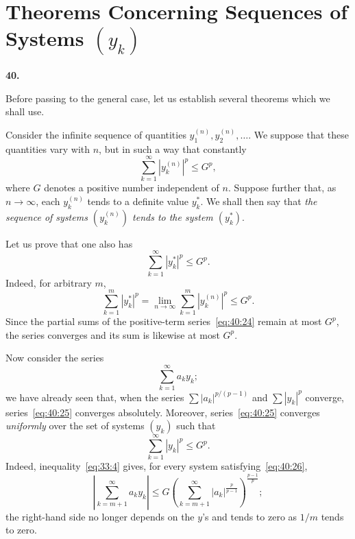 \documentclass[
  paper=b5,
  fontsize=13pt,
  twoside=true,
  open=any,
  bookmarkpackage=false,
  chapterprefix=true,
  headings=normal
]{scrbook}
\theoremstyle{definition}
\newcommand{\numberedparagraph}[1]{%
  \par\medskip\phantomsection\label{sec:#1}%
  \noindent\textbf{#1.}\enspace
}
\begin{document}
\section{Theorems Concerning Sequences of Systems
\texorpdfstring{\((y_k)\)}{(y\_k)}}

\numberedparagraph{40}
Before passing to the general case, let us establish several theorems which we shall use.

Consider the infinite sequence of quantities $y_1^{(n)},y_2^{(n)},\ldots$. We suppose that these quantities vary with $n$, but in such a way that constantly
\[
 \sum_{k=1}^{\infty}|y_k^{(n)}|^p\leq G^p,
\]
where $G$ denotes a positive number independent of $n$. Suppose further that, as $n\to\infty$, each $y_k^{(n)}$ tends to a definite value $y_k^*$. We shall then say that \emph{the sequence of systems $(y_k^{(n)})$ tends to the system $(y_k^*)$}.

Let us prove that one also has
\begin{equation}
 \sum_{k=1}^{\infty}|y_k^*|^p\leq G^p.
 \tag{24}\label{eq:40:24}
\end{equation}
Indeed, for arbitrary $m$,
\[
 \sum_{k=1}^{m}|y_k^*|^p
 =\lim_{n\to\infty}\sum_{k=1}^{m}|y_k^{(n)}|^p
 \leq G^p.
\]
Since the partial sums of the positive-term series~\eqref{eq:40:24} remain at most $G^p$, the series converges and its sum is likewise at most $G^p$.

Now consider the series
\begin{equation}
 \sum_{k=1}^{\infty}a_ky_k;
 \tag{25}\label{eq:40:25}
\end{equation}
we have already seen that, when the series $\sum|a_k|^{p/(p-1)}$ and $\sum|y_k|^p$ converge, series~\eqref{eq:40:25} converges absolutely. Moreover, series~\eqref{eq:40:25} converges \emph{uniformly} over the set of systems $(y_k)$ such that
\begin{equation}
 \sum_{k=1}^{\infty}|y_k|^p\leq G^p.
 \tag{26}\label{eq:40:26}
\end{equation}
Indeed, inequality~\eqref{eq:33:4} gives, for every system satisfying~\eqref{eq:40:26},
\begin{equation}
 \left|\sum_{k=m+1}^{\infty}a_ky_k\right|
 \leq G
 \left(\sum_{k=m+1}^{\infty}|a_k|^{\frac{p}{p-1}}\right)^{\frac{p-1}{p}};
 \tag{27}\label{eq:40:27}
\end{equation}
the right-hand side no longer depends on the $y$'s and tends to zero as $1/m$ tends to zero.
\end{document}

